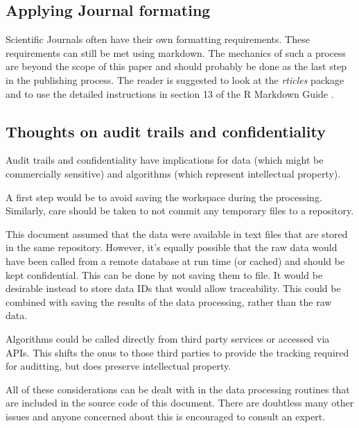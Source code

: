 \documentclass[11pt,]{article}
\begin{document}
\hypertarget{applying-journal-formating}{%
\subsection{Applying Journal formating}\label{applying-journal-formating}}

Scientific Journals often have their own formatting requirements. These requirements can still be met using markdown. The mechanics of such a process are beyond the scope of this paper and should probably be done as the last step in the publishing process. The reader is suggested to look at the \emph{rticles} package and to use the detailed instructions in section 13 of the R Markdown Guide \citep{R-Markdown-Guide}.

\hypertarget{thoughts-on-audit-trails-and-confidentiality}{%
\subsection{Thoughts on audit trails and confidentiality}\label{thoughts-on-audit-trails-and-confidentiality}}

Audit trails and confidentiality have implications for data (which might be commercially sensitive) and algorithms (which represent intellectual property).

A first step would be to avoid saving the workspace during the processing. Similarly, care should be taken to not commit any temporary files to a repository.

This document assumed that the data were available in text files that are stored in the same repository. However, it's equally possible that the raw data would have been called from a remote database at run time (or cached) and should be kept confidential. This can be done by not saving them to file. It would be desirable instead to store data IDs that would allow traceability. This could be combined with saving the results of the data processing, rather than the raw data.

Algorithms could be called directly from third party services or accessed via APIs. This shifts the onus to those third parties to provide the tracking required for auditting, but does preserve intellectual property.

All of these considerations can be dealt with in the data processing routines that are included in the source code of this document. There are doubtless many other issues and anyone concerned about this is encouraged to consult an expert.
\end{document}
